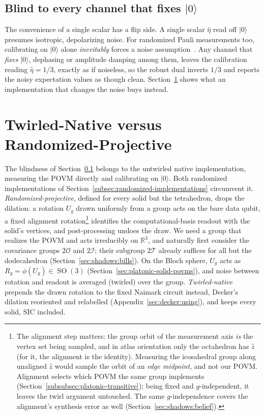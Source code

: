 \documentclass[11pt, oneside, openany]{scrbook}
\DeclareMathOperator{\SO}{SO}
\newcommand{\R}{\mathbb{R}}
\newcommand{\Tgroup}{\mathcal{T}}  %
\newcommand{\Ogroup}{\mathcal{O}}  %
\newcommand{\Igroup}{\mathcal{I}}  %
\newcommand{\TwoT}{2\Tgroup}
\newcommand{\TwoO}{2\Ogroup}
\newcommand{\TwoI}{2\Igroup}
\newcommand{\ket}[1]{|#1\rangle}
\begin{document}
\subsection{Blind to every channel that fixes \texorpdfstring{$\ket{0}$}{|0⟩}} \label{sec:shadows:blind}

The convenience of a single scalar has a flip side. A single scalar $\hat\eta$ read off $\ket{0}$ presumes isotropic, depolarizing noise. For randomized Pauli measurements too, calibrating on $\ket{0}$ alone \textit{inevitably} forces a noise assumption~\cite{wilkens2026localrobustshadowsa}. Any channel that \textit{fixes} $\ket{0}$, dephasing or amplitude damping among them, leaves the calibration reading $\hat\eta = 1/3$, exactly as if noiseless, so the robust dual inverts $1/3$ and reports the noisy expectation values as though clean. Section~\ref{sec:shadows:twirlednatvsrandomproj} shows what an implementation that changes the noise buys instead.

\section{Twirled-Native versus Randomized-Projective} \label{sec:shadows:twirlednatvsrandomproj}

The blindness of Section~\ref{sec:shadows:blind} belongs to the untwirled native implementation, measuring the POVM directly and calibrating on $\ket{0}$. Both randomized implementations of Section~\ref{subsec:randomized-implementations} circumvent it. \textit{Randomized-projective}, defined for every solid but the tetrahedron, drops the dilation: a rotation $U_g$ drawn uniformly from a group acts on the bare data qubit, a fixed alignment rotation\footnote{The alignment step matters: the group orbit of the measurement axis \textit{is} the vertex set being sampled, and in atlas orientation only the octahedron has $\hat z$ (for it, the alignment is the identity). Measuring the icosahedral group along unaligned $\hat z$ would sample the orbit of an \textit{edge midpoint}, and not our POVM. Alignment selects which POVM the same group implements (Section~\ref{subsubsec:platonic-transitive}); being fixed and $g$-independent, it leaves the twirl argument untouched. The same $g$-independence covers the alignment's synthesis error as well (Section~\ref{sec:shadows:belief}).} identifies the computational-basis readout with the solid's vertices, and post-processing undoes the draw. We need a group that realizes the POVM and acts irreducibly on $\R^3$, and naturally first consider the covariance groups $\TwoO$ and $\TwoI$; their subgroup $\TwoT$ already suffices for all but the dodecahedron (Section~\ref{sec:shadows:bills}). On the Bloch sphere, $U_g$ acts as $R_g = \phi(U_g) \in \SO(3)$ (Section~\ref{sec:platonic-solid-povms}), and noise between rotation and readout is averaged (twirled) over the group. \textit{Twirled-native} prepends the drawn rotation to the fixed Naimark circuit instead, Decker's dilation reoriented and relabelled (Appendix~\ref{sec:decker:using}), and keeps every solid, SIC included.
\end{document}
